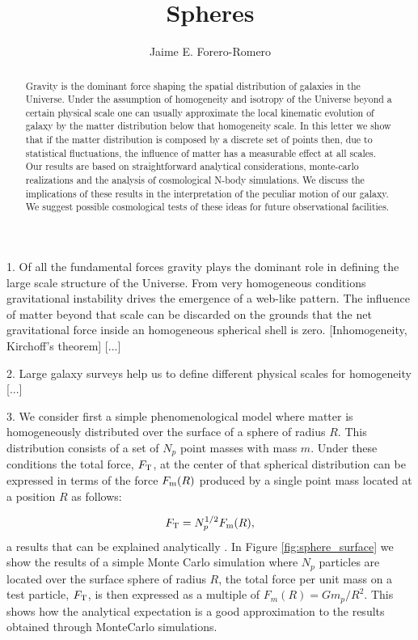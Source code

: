 \documentclass{article}
\title{Spheres}
\author{Jaime E. Forero-Romero}
\begin{document}
\maketitle
\begin{abstract}

Gravity is the dominant force shaping the spatial distribution of galaxies in
the Universe. Under the assumption of homogeneity and isotropy of the Universe
beyond a certain physical scale one can usually approximate the local
kinematic evolution of galaxy by the matter distribution below that
homogeneity scale. In this letter we show that if the matter
distribution is composed by a discrete set of points then, due to
statistical fluctuations, the influence of matter has a measurable
effect at all scales. Our results are based on straightforward
analytical considerations, monte-carlo realizations and the analysis
of cosmological N-body simulations. We discuss the implications of
these results in the interpretation of the peculiar motion of our
galaxy. We suggest possible cosmological tests of these ideas for
future observational facilities. 



\end{abstract}

1. Of all the fundamental forces gravity plays the dominant role in
defining the large scale structure of the Universe. From very
homogeneous conditions gravitational instability drives the emergence
of a web-like pattern. The influence of
matter beyond that scale can be discarded on the grounds that
the net gravitational force inside an homogeneous spherical
shell is zero. [Inhomogeneity, Kirchoff's theorem] [...]



2. Large galaxy surveys help us to define different physical scales for
homogeneity [...]


3. We consider first a simple phenomenological model where matter is
homogeneously distributed over the surface of a sphere of radius
$R$. This distribution consists of a set of $N_p$ point masses with mass
$m$. Under these conditions the total force, $F_{\rm T}$, at the
center of that spherical distribution can be expressed in terms of the
force $F_{\rm m}(R)$ produced by a single point mass located at a
position  $R$ as follows:  

\begin{equation}
F_{\rm T } = N_p^{1/2} F_{\rm m} (R),
\end{equation}
%
a results that can be explained analytically
\cite{Chandra43,Carati2008}. In Figure \ref{fig:sphere_surface} we
show the results of a simple Monte Carlo simulation where $N_p$
particles are located over the surface sphere of radius $R$, the total force per
unit mass on a test particle, $F_{\rm T}$, is then expressed as a
multiple of $F_{m}(R)=Gm_p/R^2$. This shows how the analytical
expectation is a good approximation to the results obtained through
MonteCarlo simulations.
\end{document}
